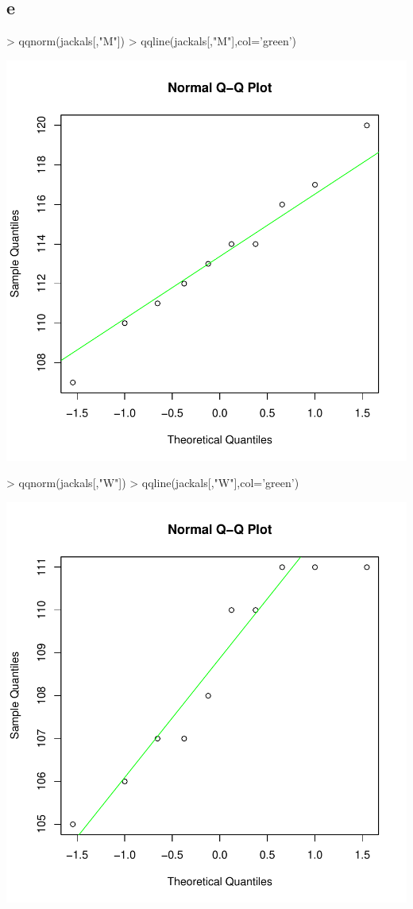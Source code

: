 \subsection{e}
\begin{Schunk}
\begin{Sinput}
> qqnorm(jackals[,"M"])
> qqline(jackals[,"M"],col='green')
\end{Sinput}
\end{Schunk}
\includegraphics{sw11_2-003}
\begin{Schunk}
\begin{Sinput}
> qqnorm(jackals[,"W"])
> qqline(jackals[,"W"],col='green')
\end{Sinput}
\end{Schunk}
\includegraphics{sw11_2-004}
